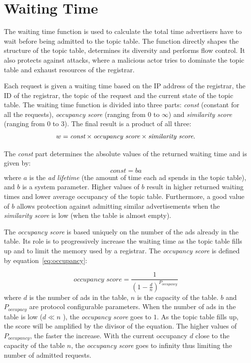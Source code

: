 \section{Waiting Time}
\label{sec:waitingTime}
The waiting time function is used to calculate the total time advertisers have to wait before being admitted to the topic table. 
The function directly shapes the structure of the topic table,  determines its diversity and performs flow control. 
It also protects against attacks, where a malicious actor tries to dominate the topic table and exhaust resources of the registrar. 

Each request is given a waiting time based on the IP address of the registrar, the ID of the registrar, the topic of the request and the current state of the topic table. 
The waiting time function is divided into three parts: \emph{const} (constant
for all the requests), \emph{occupancy score} (ranging from $0$ to $\infty$)
and  \emph{similarity score} (ranging from $0$ to $3$). The final result is a
product of all three:
\begin{equation}
\label{eq:global}
w = \emph{const} \times \textit{occupancy score} \times \textit{similarity score}. 
\end{equation}

The \emph{const} part determines the absolute values of the returned waiting time and is given by:
\begin{equation}
\label{eq:const}
    \textit{const} = ba
\end{equation}
where $a$ is the \emph{ad lifetime} (the amount of time each ad spends in the
topic table), and $b$ is a system parameter. Higher values of $b$ result in
higher returned waiting times and lower average occupancy of the topic table.
Furthermore, a good value of $b$ allows protection against admitting similar advertisements when the \emph{similarity score} is low (\ie when the table is almost empty).

The \emph{occupancy score} is based uniquely on the number of the ads already in the table.
Its role is to progressively increase the waiting time as the topic table fills up and to limit the memory used by a registrar.
The \emph{occupancy score} is defined by equation~\ref{eq:occupancy}:

\begin{equation}
\label{eq:occupancy}
    \textit{occupancy score} = \frac{1}{(1-\frac{d}{n})^{P_{occupancy}}}
\end{equation}
where $d$ is the number of ads in the table, $n$ is the capacity of the table. $b$ and $P_{occupacy}$ are protocol configurable parameters. 
When the number of ads in the table is low ($d \ll n$ ), the \emph{occupancy score} goes to $1$. 
As the topic table fills up, the score will be amplified by the divisor of the equation. 
The higher values of $P_{occupancy}$, the faster the increase. 
With the current occupancy $d$ close to the capacity of the table $n$, the \emph{occupancy score} goes to infinity thus limiting the number of admitted requests.

